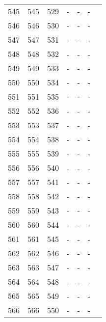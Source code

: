 \begin{longtable}{rrrllll}
  545 & 545 & 529 & - & - & - &  \\ 
  546 & 546 & 530 & - & - & - &  \\ 
  547 & 547 & 531 & - & - & - &  \\ 
  548 & 548 & 532 & - & - & - &  \\ 
  549 & 549 & 533 & - & - & - &  \\ 
  550 & 550 & 534 & - & - & - &  \\ 
  551 & 551 & 535 & - & - & - &  \\ 
  552 & 552 & 536 & - & - & - &  \\ 
  553 & 553 & 537 & - & - & - &  \\ 
  554 & 554 & 538 & - & - & - &  \\ 
  555 & 555 & 539 & - & - & - &  \\ 
  556 & 556 & 540 & - & - & - &  \\ 
  557 & 557 & 541 & - & - & - &  \\ 
  558 & 558 & 542 & - & - & - &  \\ 
  559 & 559 & 543 & - & - & - &  \\ 
  560 & 560 & 544 & - & - & - &  \\ 
  561 & 561 & 545 & - & - & - &  \\ 
  562 & 562 & 546 & - & - & - &  \\ 
  563 & 563 & 547 & - & - & - &  \\ 
  564 & 564 & 548 & - & - & - &  \\ 
  565 & 565 & 549 & - & - & - &  \\ 
  566 & 566 & 550 & - & - & - &  \\ 
   \hline
\hline
\end{longtable}

